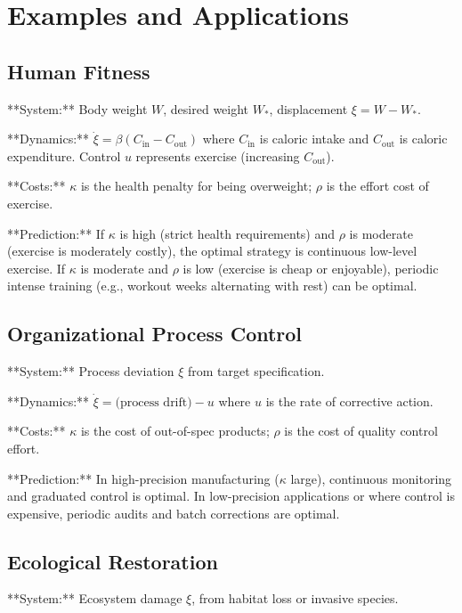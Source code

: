 \documentclass[12pt]{article}
\begin{document}
\section{Examples and Applications}

\subsection{Human Fitness}

**System:** Body weight $W$, desired weight $W_*$, displacement $\xi = W - W_*$.

**Dynamics:** $\dot{\xi} = \beta (C_{\text{in}} - C_{\text{out}})$ where $C_{\text{in}}$ is caloric intake and $C_{\text{out}}$ is caloric expenditure. Control $u$ represents exercise (increasing $C_{\text{out}}$).

**Costs:** $\kappa$ is the health penalty for being overweight; $\rho$ is the effort cost of exercise.

**Prediction:** If $\kappa$ is high (strict health requirements) and $\rho$ is moderate (exercise is moderately costly), the optimal strategy is continuous low-level exercise. If $\kappa$ is moderate and $\rho$ is low (exercise is cheap or enjoyable), periodic intense training (e.g., workout weeks alternating with rest) can be optimal.

\subsection{Organizational Process Control}

**System:** Process deviation $\xi$ from target specification.

**Dynamics:** $\dot{\xi} = \text{(process drift)} - u$ where $u$ is the rate of corrective action.

**Costs:** $\kappa$ is the cost of out-of-spec products; $\rho$ is the cost of quality control effort.

**Prediction:** In high-precision manufacturing ($\kappa$ large), continuous monitoring and graduated control is optimal. In low-precision applications or where control is expensive, periodic audits and batch corrections are optimal.

\subsection{Ecological Restoration}

**System:** Ecosystem damage $\xi$, from habitat loss or invasive species.
\end{document}
